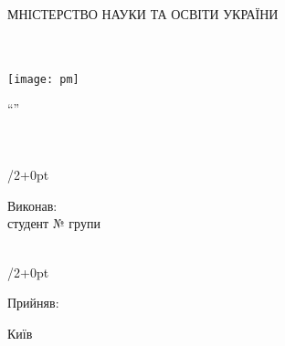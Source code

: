 
\newlength{\rightshift}
\setlength{\rightshift}{35pt}

\thispagestyle{empty}

{\sffamily
\begin{Center}
	\LARGE{МНІСТЕРСТВО НАУКИ ТА ОСВІТИ УКРАЇНИ}\\
	\LARGE{\university{}}\\
	\Large{\faculty{}}\\
	\Large{\department{}}
\end{Center}

\vspace*{\fill}

\begin{Center}
	\texttt{[image: pm]}\\
\end{Center}

\vspace*{\fill}

\begin{Center}
	\Large
	\enquote{\subjectname{}}\\
	\prodname{} \prodnumber{}\\
	\proddate{}\\
\end{Center}

\vspace*{\fill}

\begin{adjustwidth}{\textwidth/2+\rightshift}{0pt}
	\begin{FlushLeft}
		\large
		Виконав:\\
		студент №\studentnumber{} групи \shortdepartment{} \groupnumber{} \shortuniversity{}\\
		\studentname{}\\
	\end{FlushLeft}
\end{adjustwidth}

\vspace{1cm}

\begin{adjustwidth}{\textwidth/2+\rightshift}{0pt}
	\begin{FlushLeft}
		\large
		Прийняв:\\
		\teacher{}
	\end{FlushLeft}
\end{adjustwidth}

\vspace*{\fill}

\begin{Center}
	Київ \the\year{}
\end{Center}
}

\pagebreak